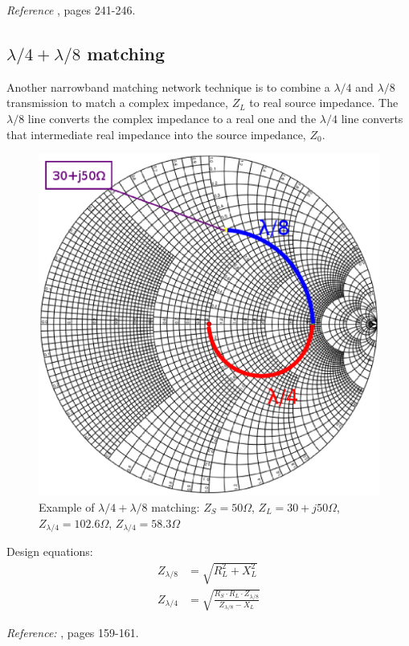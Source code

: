 \noindent \textit{Reference} \cite{Pozar}, pages 241-246.

\subsection{$\lambda/4 + \lambda/8$ matching}
Another narrowband matching network technique is to combine a $\lambda/4$ and $\lambda/8$ transmission to match a complex impedance, $Z_L$ to real source impedance. The $\lambda/8$ line converts the complex impedance to a real one and the $\lambda/4$ line converts that intermediate real impedance into the source impedance, $Z_0$.

\begin{figure}[H]
\centering
\includegraphics[width=120mm]{Smithl8l4}
\caption{Example of $\lambda/4 + \lambda/8$ matching: $Z_S = 50\Omega$, $Z_L = 30+j50\Omega$, $Z_{\lambda/4} = 102.6\Omega$, $Z_{\lambda/4} = 58.3\Omega$}
\label{fig:SmithL8L4}
\end{figure}


\noindent Design equations:
\begin{align}
Z_{\lambda/8} & = \sqrt{R_L^2 + X_L^2} \\
Z_{\lambda/4} & = \sqrt{\frac{R_S \cdot R_L \cdot Z_{\lambda/8}}{Z_{\lambda/8}-X_L}}
\end{align}


\noindent \textit{Reference:} \cite{BahlFundamentalsRFMW}, pages 159-161.



